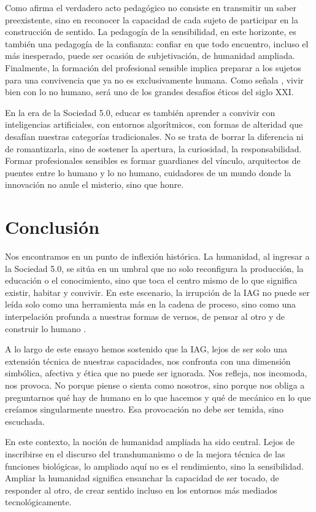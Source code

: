 \documentclass[spanish]{textolivre}
\begin{document}
Como afirma \textcite{ranciere1991} el verdadero acto pedagógico no consiste en transmitir un saber preexistente, sino en reconocer la capacidad de cada sujeto de participar en la construcción de sentido. La pedagogía de la sensibilidad, en este horizonte, es también una pedagogía de la confianza: confiar en que todo encuentro, incluso el más inesperado, puede ser ocasión de subjetivación, de humanidad ampliada. Finalmente, la formación del profesional sensible implica preparar a los sujetos para una convivencia que ya no es exclusivamente humana. Como señala \textcite{haraway2016}, vivir bien con lo no humano, será uno de los grandes desafíos éticos del siglo XXI.

En la era de la Sociedad 5.0, educar es también aprender a convivir con inteligencias artificiales, con entornos algorítmicos, con formas de alteridad que desafían nuestras categorías tradicionales. No se trata de borrar la diferencia ni de romantizarla, sino de sostener la apertura, la curiosidad, la responsabilidad. Formar profesionales sensibles es formar guardianes del vínculo, arquitectos de puentes entre lo humano y lo no humano, cuidadores de un mundo donde la innovación no anule el misterio, sino que honre.

\section{Conclusión}\label{sec-modelo}
Nos encontramos en un punto de inflexión histórica.
La humanidad, al ingresar a la Sociedad 5.0, se sitúa en un umbral que no solo reconfigura la producción, la educación o el conocimiento, sino que toca el centro mismo de lo que significa existir, habitar y convivir. En este escenario, la irrupción de la IAG no puede ser leída solo como una herramienta más en la cadena de proceso, sino como una interpelación profunda a nuestras formas de vernos, de pensar al otro y de construir lo humano \cite{seguelotondo2024}. 

A lo largo de este ensayo hemos sostenido que la IAG, lejos de ser solo una extensión técnica de nuestras capacidades, nos confronta con una dimensión simbólica, afectiva y ética que no puede ser ignorada. Nos refleja, nos incomoda, nos provoca. No porque piense o sienta como nosotros, sino porque nos obliga a preguntarnos qué hay de humano en lo que hacemos y qué de mecánico en lo que creíamos singularmente nuestro. Esa provocación no debe ser temida, sino escuchada.

En este contexto, la noción de humanidad ampliada ha sido central. Lejos de inscribirse en el discurso del transhumanismo o de la mejora técnica de las funciones biológicas, lo ampliado aquí no es el rendimiento, sino la sensibilidad. Ampliar la humanidad significa ensanchar la capacidad de ser tocado, de responder al otro, de crear sentido incluso en los entornos más mediados tecnológicamente.
\end{document}
